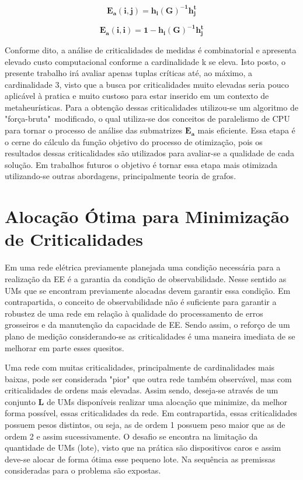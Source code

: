 \documentclass[12pt]{article}
\begin{document}
\begin{equation}
	\mathbf{E_a(i,j)= h_i(G)^{-1}h_ j^t}
	\label{eq3}
\end{equation}
	
\begin{equation}
	\mathbf{E_a(i,i)= 1 -  h_i(G)^{-1}h_ j^t}
	\label{eq4}
\end{equation}

Conforme dito, a análise de criticalidades de medidas é combinatorial e apresenta elevado custo computacional conforme a cardinalidade k se eleva. Isto posto, o presente trabalho irá avaliar apenas tuplas críticas até, ao máximo, a cardinalidade 3, visto que a busca por criticalidades muito elevadas seria pouco aplicável à pratica e muito custoso para estar inserido em um contexto de metaheurísticas. Para a obtenção dessas criticalidades utilizou-se um algoritmo de "força-bruta"~modificado, o qual utiliza-se dos conceitos de paralelismo de CPU para tornar o processo de análise das submatrizes $\mathbf{E_a}$ mais eficiente. Essa etapa é o cerne do cálculo da função objetivo do processo de otimização, pois os resultados dessas criticalidades são utilizados para avaliar-se a qualidade de cada solução. Em trabalhos futuros o objetivo é tornar essa etapa mais otimizada utilizando-se outras abordagens, principalmente teoria de grafos.



\section{Alocação Ótima para Minimização de Criticalidades}

Em uma rede elétrica previamente planejada uma condição necessária para a realização da EE é a garantia da condição de observabilidade. Nesse sentido as UMs que se encontram previamente alocadas devem garantir essa condição. Em contrapartida, o conceito de observabilidade não é suficiente para garantir a robustez de uma rede em relação à qualidade do processamento de erros grosseiros e da manutenção da capacidade de EE. Sendo assim, o reforço de um plano de medição considerando-se as criticalidades é uma maneira imediata de se melhorar em parte esses quesitos.

Uma rede com muitas criticalidades, principalmente de cardinalidades mais baixas, pode ser considerada "pior" que outra rede também observável, mas com criticalidades de ordens mais elevadas. Assim sendo, deseja-se através de um conjunto $\mathbf{L}$ de UMs disponíveis realizar uma alocação que minimize, da melhor forma possível, essas criticalidades da rede. Em contrapartida, essas criticalidades possuem pesos distintos, ou seja, as de ordem 1 possuem peso maior que as de ordem 2 e assim sucessivamente. O desafio se encontra na limitação da quantidade de UMs (lote), visto que na prática são dispositivos caros e assim deve-se alocar de forma ótima esse pequeno lote. Na sequência as premissas consideradas para o problema são expostas.
\end{document}
